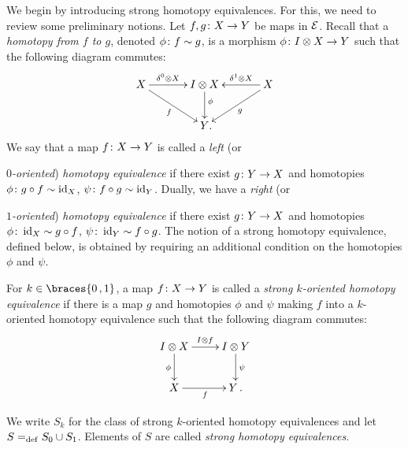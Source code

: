 \documentclass[reqno,10pt,a4paper,oneside,draft]{amsart}
\begin{document}
We begin by introducing strong homotopy equivalences.
For this, we need to review some preliminary notions.
Let $f, g \colon X \to Y$ be maps in $\mathcal{E}$.
Recall that a \emph{homotopy from $f$ to $g$}, denoted $\phi \colon f \sim g$, is a morphism $\phi \colon I \otimes X \to Y$ such that the following diagram commutes:
\begin{equation} \label{equ:homotopy}
\begin{gathered}
\xymatrix@C=1.2cm{
  X
  \ar[r]^-{\lcyl \otimes X}
  \ar[dr]_{f}
&
  \interval \otimes X
  \ar[d]^(0.4){\phi}
&
  X
  \ar[dl]^{g}
  \ar[l]_-{\rcyl \otimes X}
\\&
  Y
\rlap{.}}
\end{gathered}
\end{equation}
We say that a map $f \colon X \to Y$ is called a \emph{left} (or {\emph{$0$-oriented}) \emph{homotopy equivalence} if there exist $g \colon Y \to X$ and homotopies $\phi \colon g \mathbin{\circ} f \sim \operatorname{id}_X $, $\psi \colon f \mathbin{\circ} g \sim \operatorname{id}_Y$.
Dually, we have a \emph{right} (or {\emph{ $1$-oriented}) \emph{homotopy equivalence} if there exist $g \colon Y \to X$ and homotopies $\phi \colon \operatorname{id}_X \sim g \mathbin{\circ} f$, $\psi \colon \operatorname{id}_Y \sim f \mathbin{\circ} g$.
The notion of a strong homotopy equivalence, defined below, is obtained by requiring an additional condition on the homotopies $\phi$ and $\psi$.

\begin{definition} \label{def:strhe}
For $k \in \braces{0\,, 1}$, a map $f \colon X \to Y$ is called a \emph{strong $k$-oriented homotopy equivalence} if there is a map $g$ and homotopies $\phi$ and $\psi$ making $f$ into a $k$-oriented homotopy equivalence such that the following diagram commutes:
\[
\xymatrix{
  \interval \otimes X
  \ar[r]^{\interval \otimes f}
  \ar[d]_{\phi}
&
  \interval \otimes Y
  \ar[d]^{\psi}
\\
  X
  \ar[r]_{f}
&
  Y \, .
}
\]
\end{definition}

We write $S_k$ for the class of strong $k$-oriented homotopy equivalences and let~$S =_{\operatorname{def}} S_0 \cup S_1$.
Elements of $S$ are called \emph{strong homotopy equivalences}.

}}
\end{document}
